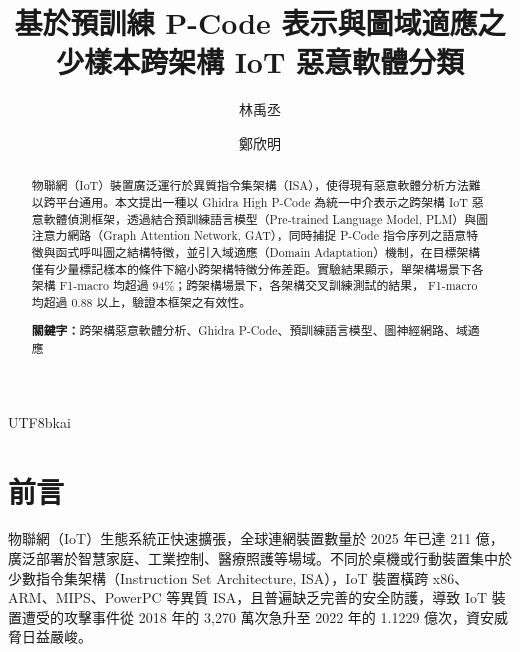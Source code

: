 \documentclass[10pt, a4paper, twocolumn]{article}
\date{}
\begin{document}
\begin{CJK*}{UTF8}{bkai}

\title{\fontsize{16pt}{1}\selectfont\textbf{基於預訓練 P-Code 表示與圖域適應之少樣本跨架構 IoT 惡意軟體分類}}

\author[1]{林禹丞}
\author[2]{鄭欣明}

\renewcommand{\Affilfont}{\fontsize{12pt}{1}\bfseries}
\renewcommand{\Authfont}{\fontsize{12pt}{1}\bfseries}
\renewcommand\Authand{, }
\setlength{\affilsep}{1mm}

\maketitle
\pagestyle{empty}
\thispagestyle{empty}

\begin{abstract}

物聯網（IoT）裝置廣泛運行於異質指令集架構（ISA），使得現有惡意軟體分析方法難以跨平台通用。本文提出一種以 Ghidra High P-Code 為統一中介表示之跨架構 IoT 惡意軟體偵測框架，透過結合預訓練語言模型（Pre-trained Language Model, PLM）與圖注意力網路（Graph Attention Network, GAT），同時捕捉 P-Code 指令序列之語意特徵與函式呼叫圖之結構特徵，並引入域適應（Domain Adaptation）機制，在目標架構僅有少量標記樣本的條件下縮小跨架構特徵分佈差距。實驗結果顯示，單架構場景下各架構 F1-macro 均超過 94\%；跨架構場景下，各架構交叉訓練測試的結果， F1-macro 均超過 0.88 以上，驗證本框架之有效性。

\textbf{關鍵字：}跨架構惡意軟體分析、Ghidra P-Code、預訓練語言模型、圖神經網路、域適應
\end{abstract}


\section{前言}

物聯網（IoT）生態系統正快速擴張，全球連網裝置數量於 2025 年已達 211 億\cite{sinha2024iot}，廣泛部署於智慧家庭、工業控制、醫療照護等場域。不同於桌機或行動裝置集中於少數指令集架構（Instruction Set Architecture, ISA），IoT 裝置橫跨 x86、ARM、MIPS、PowerPC 等異質 ISA，且普遍缺乏完善的安全防護，導致 IoT 裝置遭受的攻擊事件從 2018 年的 3,270 萬次急升至 2022 年的 1.1229 億次\cite{petrosyan2024statista}，資安威脅日益嚴峻\cite{qureshi2024systematic}。


\end{CJK*}
\end{document}

